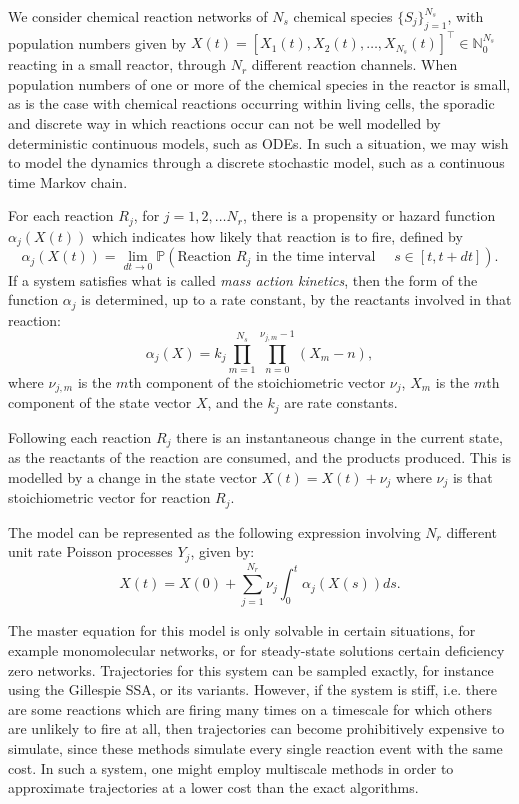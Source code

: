 \documentclass[final]{siamltex}
\begin{document}
We consider chemical reaction networks of $N_s$ chemical species $\{S_j\}_{j=1}^{N_s}$,
with population numbers given by $X(t) = [X_1(t), X_2(t), \ldots, X_{N_s}(t)]^\top \in
\mathbb{N}_0^{N_s}$ reacting in a small reactor, through $N_r$ different reaction
channels. When population numbers of one or more of the chemical
species in the reactor is small, as is the case with chemical
reactions occurring within living cells, the sporadic and discrete way
in which reactions occur can not be well modelled by deterministic
continuous models, such as ODEs. In such a situation, we may wish to
model the dynamics through a discrete stochastic model, such as a
continuous time Markov chain.

For each reaction $R_j$, for $j = 1,2,\ldots N_r$, there is a
propensity or hazard function $\alpha_j(X(t))$ which indicates how
likely that reaction is to fire, defined by
\[\alpha_j(X(t)) = \lim_{dt \to 0} \mathbb{P}(\text{Reaction $R_j$ in
    the time interval  } \quad s \in [t, t+ dt] ).\] If a system
satisfies what is called \emph{mass action kinetics}, then the form of
the function $\alpha_j$ is determined, up to a rate constant, by the
reactants involved in that reaction:
\begin{equation}\label{eq:MAK}
\alpha_j(X) = k_j \prod_{m=1}^{N_s} \prod_{n=0}^{\nu_{j,m} -1} (X_m - n),
\end{equation}
where $\nu_{j,m}$ is the $m$th component of the stoichiometric vector
$\nu_j$, $X_m$ is the $m$th component of the state vector $X$, and the
$k_j$ are rate constants.

Following each reaction $R_j$ there is an instantaneous change in the
current state, as the reactants of the reaction are consumed, and the
products produced. This is modelled by a change in the state vector
$X(t) = X(t) + \nu_j$ where $\nu_j$ is that stoichiometric vector for
reaction $R_j$.

The model can be represented as the following expression involving
$N_r$ different unit rate Poisson
processes\cite{anderson2011continuous} $Y_j$, given by:
\begin{equation}\label{eq:RTC}
X(t) = X(0) + \sum_{j=1}^{N_r} \nu_j \int_0^t \alpha_j(X(s)) ds.
\end{equation}

The master equation for this model is only solvable in certain
situations, for example monomolecular networks\cite{jahnke2007solving}, or for
steady-state solutions certain deficiency
zero networks\cite{anderson2010product,anderson2016product}. Trajectories for this system can be
sampled exactly, for instance using the Gillespie SSA\cite{gillespie1977exact}, or
its variants\cite{gillespie2007stochastic,cao2004efficient,anderson2007modified}. However, if the system is stiff, i.e. there
are some reactions which are firing many times on a timescale for
which others are unlikely to fire at all, then trajectories can become
prohibitively expensive to simulate, since these methods simulate
every single reaction event with the same cost. In such a system, one
might employ multiscale methods in order to approximate trajectories
at a lower cost than the exact algorithms.
\end{document}
